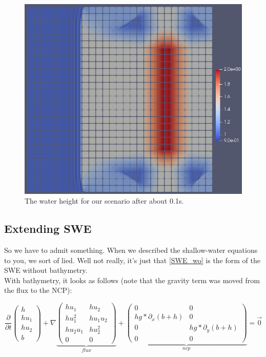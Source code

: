 \documentclass[12pt,letterpaper]{article}
\begin{document}
\begin{figure}[!h]
\centering
\includegraphics[width=0.70\linewidth]{SWE_wo.png}
\caption{The water height for our scenario after about 0.1s.}
\end{figure}

\newpage

\subsection{Extending SWE}

\vspace{0.2cm}

So we have to admit something. When we described the shallow-water equations to you, we sort of lied.
Well not really, it's just that \ref{SWE_wo} is the form of the SWE without bathymetry.\\
With bathymetry, it looks as follows (note that the gravity term was moved from the flux to the NCP):

\begin{equation*} \label{SWE_w}
    \frac{\partial}{\partial t}\left(
    \begin{array}{lr} h \\
        h u_1 \\
        h u_2 \\
        b
        \end{array} \right) +
    \nabla \underbrace{\begin{pmatrix}
        h u_1           & h u_2     \\
        h u_1^2         & h u_1 u_2 \\
        h u_2 u_1       & h u_2^2   \\
        0               & 0
    \end{pmatrix}}_{ flux } +
    \underbrace{\begin{pmatrix}
        0                     & 0\\
        h g*\partial_x(b+h)   & 0\\
        0                     & h g*\partial_y(b+h) \\
        0                     & 0
    \end{pmatrix}}_{ ncp }  = \vec{0}
\end{equation*}
\end{document}
